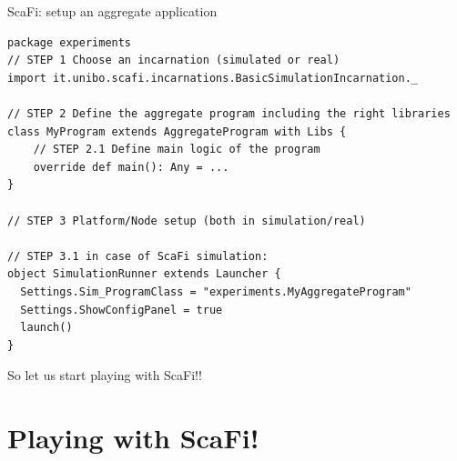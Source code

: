 \documentclass[presentation, 9pt]{beamer}\mode<presentation>{\usetheme{AMSBolognaFC}}
\begin{document}
\begin{frame}[fragile]{ScaFi: setup an aggregate application}

\begin{verbatim}
package experiments
// STEP 1 Choose an incarnation (simulated or real)
import it.unibo.scafi.incarnations.BasicSimulationIncarnation._

// STEP 2 Define the aggregate program including the right libraries
class MyProgram extends AggregateProgram with Libs {
	// STEP 2.1 Define main logic of the program
	override def main(): Any = ...
}

// STEP 3 Platform/Node setup (both in simulation/real)

// STEP 3.1 in case of ScaFi simulation:
object SimulationRunner extends Launcher {
  Settings.Sim_ProgramClass = "experiments.MyAggregateProgram"
  Settings.ShowConfigPanel = true
  launch()
}
\end{verbatim}
\begin{center}
{\huge So let us start playing with ScaFi!! \bold{\faSmileO}}
\end{center}
\end{frame}
\section{Playing with ScaFi!}
\end{document}
